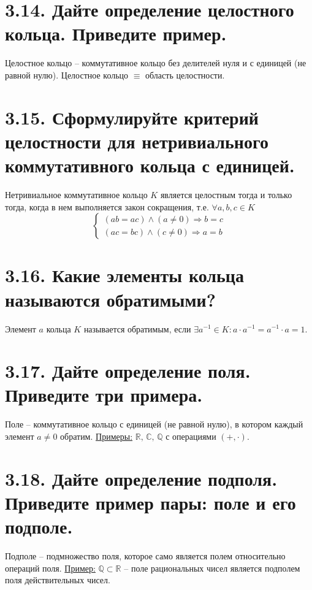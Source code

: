 \documentclass{article}
\begin{document}
\section*{\LARGE 3.14. Дайте определение целостного кольца. Приведите пример. }
Целостное кольцо -- коммутативное кольцо без делителей нуля и с единицей (не равной нулю). Целостное кольцо $\equiv$ область целостности.

\section*{\LARGE 3.15. Сформулируйте критерий целостности для нетривиального коммутативного кольца с единицей. }
Нетривиальное коммутативное кольцо $K$ является целостным тогда и только тогда, когда в нем выполняется закон сокращения, т.е. $\forall a,b,c \in K$
$$
\begin{cases}
(ab = ac)\wedge(a \ne 0) \Rightarrow b = c \\
(ac = bc)\wedge(c\ne 0) \Rightarrow a = b
\end{cases}
$$

\section*{\LARGE 3.16. Какие элементы кольца называются обратимыми? }
Элемент $a$ кольца $K$ называется обратимым, если $\exists a^{-1} \in K : a\cdot a^{-1} = a^{-1}\cdot a = 1$.

\section*{\LARGE 3.17. Дайте определение поля. Приведите три примера. }
Поле -- коммутативное кольцо с единицей (не равной нулю), в котором каждый элемент $a \ne 0$ обратим.
\newline \underline{Примеры:} $\mathbb{R}, \, \mathbb{C}, \, \mathbb{Q}$ с операциями $(+, \cdot)$.

\section*{\LARGE 3.18. Дайте определение подполя. Приведите пример пары: поле и его подполе. }
Подполе -- подмножество поля, которое само является полем относительно операций поля.
\newline \underline{Пример:} $\mathbb{Q} \subset \mathbb{R}$ -- поле рациональных чисел является подполем поля действительных чисел.   
\end{document}
